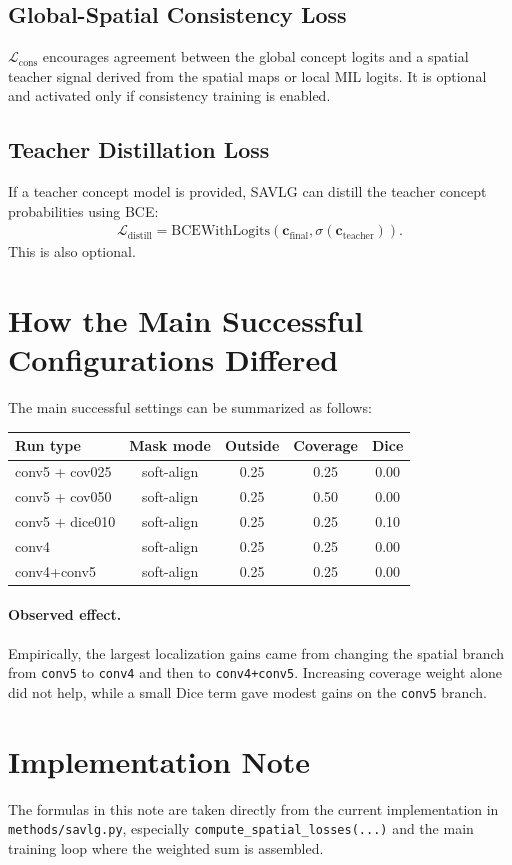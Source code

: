 \documentclass[11pt]{article}
\begin{document}
\subsection{Global-Spatial Consistency Loss}
\(\mathcal{L}_{\mathrm{cons}}\) encourages agreement between the global concept
logits and a spatial teacher signal derived from the spatial maps or local MIL logits.
It is optional and activated only if consistency training is enabled.

\subsection{Teacher Distillation Loss}
If a teacher concept model is provided, SAVLG can distill the teacher concept
probabilities using BCE:
\begin{align}
\mathcal{L}_{\mathrm{distill}}
=
\mathrm{BCEWithLogits}(\bm{c}_{\mathrm{final}}, \sigma(\bm{c}_{\mathrm{teacher}})).
\end{align}
This is also optional.

\section{How the Main Successful Configurations Differed}
The main successful settings can be summarized as follows:
\begin{center}
\begin{tabular}{lcccc}
\toprule
Run type & Mask mode & Outside & Coverage & Dice \\
\midrule
conv5 + cov025 & soft-align & 0.25 & 0.25 & 0.00 \\
conv5 + cov050 & soft-align & 0.25 & 0.50 & 0.00 \\
conv5 + dice010 & soft-align & 0.25 & 0.25 & 0.10 \\
conv4 & soft-align & 0.25 & 0.25 & 0.00 \\
conv4+conv5 & soft-align & 0.25 & 0.25 & 0.00 \\
\bottomrule
\end{tabular}
\end{center}

\paragraph{Observed effect.}
Empirically, the largest localization gains came from changing the spatial branch
from \texttt{conv5} to \texttt{conv4} and then to \texttt{conv4+conv5}. Increasing
coverage weight alone did not help, while a small Dice term gave modest gains on
the \texttt{conv5} branch.

\section{Implementation Note}
The formulas in this note are taken directly from the current implementation in
\texttt{methods/savlg.py}, especially \texttt{compute\_spatial\_losses(...)} and
the main training loop where the weighted sum is assembled.
\end{document}
